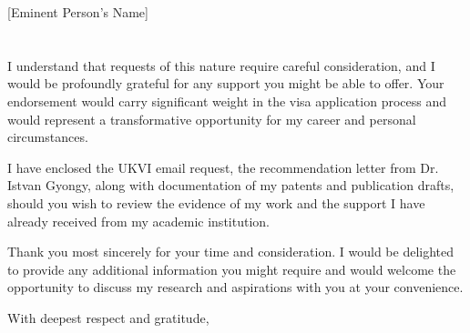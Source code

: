 \documentclass[11pt,a4paper]{letter}
\begin{document}
\begin{letter}{[Eminent Person's Name]\\[Title/Position]\\[Institution/Organization]\\[Address]}
I understand that requests of this nature require careful consideration, and I would be profoundly grateful for any support you might be able to offer. Your endorsement would carry significant weight in the visa application process and would represent a transformative opportunity for my career and personal circumstances.

I have enclosed the UKVI email request, the recommendation letter from Dr. Istvan Gyongy, along with documentation of my patents and publication drafts, should you wish to review the evidence of my work and the support I have already received from my academic institution.

Thank you most sincerely for your time and consideration. I would be delighted to provide any additional information you might require and would welcome the opportunity to discuss my research and aspirations with you at your convenience.

\closing{With deepest respect and gratitude,}

\signature{[Your Name]}


\end{letter}
\end{document}
